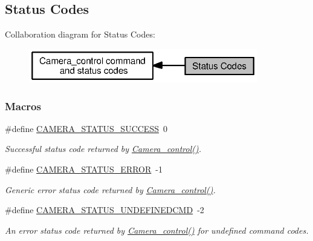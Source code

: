 \subsection{Status Codes}
\label{group___camera___s_t_a_t_u_s}
Collaboration diagram for Status Codes\+:
\nopagebreak
\begin{figure}[H]
\begin{center}
\leavevmode
\includegraphics[width=283pt]{group___camera___s_t_a_t_u_s}
\end{center}
\end{figure}
\subsubsection*{Macros}
\begin{DoxyCompactItemize}
\item 
\#define \hyperlink{group___camera___s_t_a_t_u_s_gaa4d73b4da4ce113c8fb545d1f2649257}{C\+A\+M\+E\+R\+A\+\_\+\+S\+T\+A\+T\+U\+S\+\_\+\+S\+U\+C\+C\+E\+S\+S}~0
\begin{DoxyCompactList}\small\item\em Successful status code returned by \hyperlink{_camera_8h_adfc7e9a60daa499220296a238a09b393}{Camera\+\_\+control()}. \end{DoxyCompactList}\item 
\#define \hyperlink{group___camera___s_t_a_t_u_s_ga2863402eca66d26cf447fc02340a0d45}{C\+A\+M\+E\+R\+A\+\_\+\+S\+T\+A\+T\+U\+S\+\_\+\+E\+R\+R\+O\+R}~-\/1
\begin{DoxyCompactList}\small\item\em Generic error status code returned by \hyperlink{_camera_8h_adfc7e9a60daa499220296a238a09b393}{Camera\+\_\+control()}. \end{DoxyCompactList}\item 
\#define \hyperlink{group___camera___s_t_a_t_u_s_gaae8cae4253d68cc8ae921b63a74d1cb9}{C\+A\+M\+E\+R\+A\+\_\+\+S\+T\+A\+T\+U\+S\+\_\+\+U\+N\+D\+E\+F\+I\+N\+E\+D\+C\+M\+D}~-\/2
\begin{DoxyCompactList}\small\item\em An error status code returned by \hyperlink{_camera_8h_adfc7e9a60daa499220296a238a09b393}{Camera\+\_\+control()} for undefined command codes. \end{DoxyCompactList}\end{DoxyCompactItemize}


